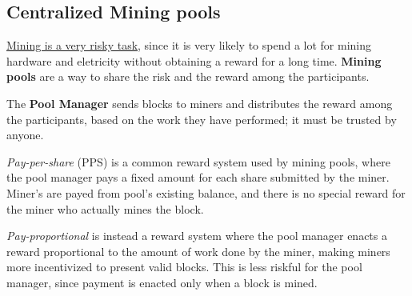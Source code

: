 \subsection{Centralized Mining pools}
\label{sec:mining_pools}
\ul{Mining is a very risky task}, since it is very likely to spend a lot for mining hardware and eletricity without
obtaining a reward for a long time.
\textbf{Mining pools} are a way to share the risk and the reward among the participants. 

The \textbf{Pool Manager} sends blocks to miners and distributes the reward among the participants, based on the work they have performed; it must be trusted by anyone.

\textit{Pay-per-share} (PPS) is a common reward system used by mining pools, where the pool manager pays a fixed amount for each share submitted by the miner.
Miner's are payed from pool's existing balance, and there is no special reward for the miner who actually mines the block.

\textit{Pay-proportional} is instead a reward system where the pool manager enacts a reward proportional to the amount of work done by the miner, making miners more incentivized to present valid blocks.
This is less riskful for the pool manager, since payment is enacted only when a block is mined.

\newpage
